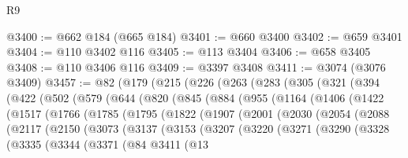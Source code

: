 \begin{lexlean}{R9}
\begin{coremodule}
@3400 := @662 @184 (@665 @184)
@3401 := @660 @3400
@3402 := @659 @3401
@3404 := @110 @3402 @116
@3405 := @113 @3404
@3406 := @658 @3405
@3408 := @110 @3406 @116
@3409 := @3397 @3408
@3411 := @3074 (@3076 @3409)
@3457 := @82
    (@179
      (@215
        (@226
          (@263
            (@283
              (@305
                (@321
                  (@394
                    (@422
                      (@502
                        (@579
                          (@644
                            (@820
                              (@845
                                (@884
                                  (@955
                                    (@1164
                                      (@1406
                                        (@1422
                                          (@1517
                                            (@1766
                                              (@1785
                                                (@1795
                                                  (@1822
                                                    (@1907
                                                      (@2001
                                                        (@2030
                                                          (@2054
                                                            (@2088
                                                              (@2117
                                                                (@2150
                                                                  (@3073
                                                                    (@3137
                                                                      (@3153
                                                                        (@3207
                                                                          (@3220
                                                                            (@3271
                                                                              (@3290
                                                                                (@3328
                                                                                  (@3335
                                                                                    (@3344
                                                                                      (@3371
                                                                                        (@84
                                                                                          @3411
                                                                                          (@13

\end{coremodule}
\end{lexlean}
